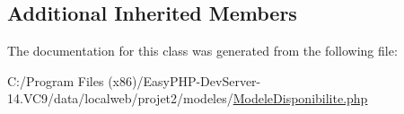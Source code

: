 \subsection*{Additional Inherited Members}


The documentation for this class was generated from the following file\+:\begin{DoxyCompactItemize}
\item 
C\+:/\+Program Files (x86)/\+Easy\+P\+H\+P-\/\+Dev\+Server-\/14.\+V\+C9/data/localweb/projet2/modeles/\hyperlink{_modele_disponibilite_8php}{Modele\+Disponibilite.\+php}\end{DoxyCompactItemize}
